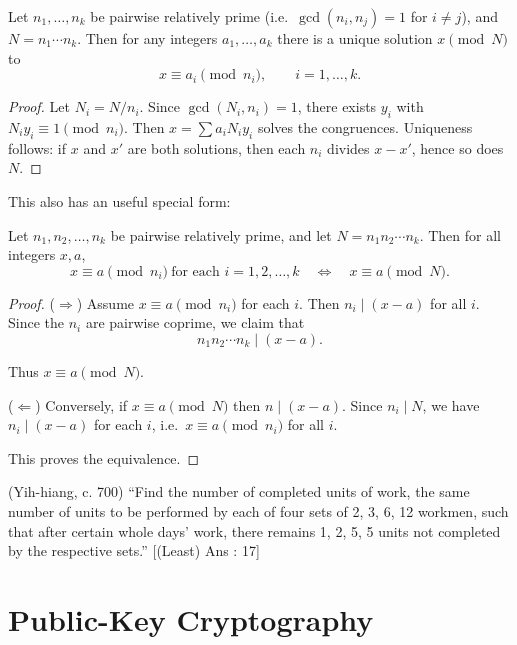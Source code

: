 \begin{theorem}
\label{thm:chinese}
Let $n_1,\dots,n_k$ be pairwise relatively prime  (i.e.\ $\gcd(n_i,n_j)=1$ for $i\neq j$), and $N=n_1\cdots n_k$. Then for any integers $a_1,\dots,a_k$ there is a unique solution $x \pmod N$ to
\[
x\equiv a_i \pmod{n_i}, \qquad i=1,\dots,k.
\]
\end{theorem}
\begin{proof}
Let $N_i=N/n_i$. Since $\gcd(N_i,n_i)=1$, there exists $y_i$ with $N_i y_i\equiv 1\pmod{n_i}$. 
Then $x=\sum a_i N_i y_i$ solves the congruences. Uniqueness follows: if $x$ and $x'$ are both solutions, then each $n_i$ divides $x-x'$, hence so does $N$.
\end{proof}

This also has an useful special form:

\begin{theorem}
Let $n_1,n_2,\dots,n_k$ be pairwise relatively prime, and let $N=n_1n_2\cdots n_k$. Then for all integers $x,a$,
\[
x \equiv a \pmod{n_i}\ \text{for each }i=1,2,\dots,k
\quad\Longleftrightarrow\quad
x \equiv a \pmod{N}.
\]
\end{theorem}

\begin{proof}
($\Rightarrow$) Assume $x \equiv a \pmod{n_i}$ for each $i$. Then $n_i \mid (x-a)$ for all $i$.
Since the $n_i$ are pairwise coprime, we claim that
\[
n_1n_2\cdots n_k \mid (x-a).
\]

Thus $x\equiv a\pmod{N}$.

\smallskip
($\Leftarrow$) Conversely, if $x\equiv a \pmod{N}$ then $n\mid(x-a)$. Since $n_i\mid N$, we have $n_i\mid(x-a)$ for each $i$, i.e.\ $x\equiv a\pmod{n_i}$ for all $i$.

\smallskip
This proves the equivalence.
\end{proof}

\begin{exercise}
(Yih-hiang, c. 700) ``Find the number of completed units of work, the same number of units to be performed by each of four sets of 2, 3, 6, 12 workmen, such that after certain whole days’ work, there remains 1, 2, 5, 5 units not completed by the respective sets.” [(Least) Ans : 17]
\end{exercise}

\section{Public-Key Cryptography}

